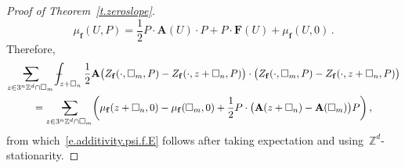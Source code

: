 \documentclass[11pt,twoside]{article} %
\makeatletter
\let\oldsquare\square %
\renewcommand{\square}{\oldsquare}
\numberwithin{equation}{section}
\theoremstyle{definition}
\newcommand*{\Zd}{\ensuremath{\mathbb{Z}^d}}
\newcommand{\f}{\mathbf{f}}
\newcommand{\cu}{\square}
\newcommand{\avsum}{\mathop{\mathpalette\avsuminner\relax}\displaylimits}
\newcommand\avsuminner[2]{%
  {\sbox0{$\m@th#1\sum$}%
   \vphantom{\usebox0}%
   \ooalign{%
     \hidewidth
     \smash{\,\rule[.23em]{8.8pt}{1.1pt} \relax}%
     \hidewidth\cr
   ~$\m@th#1\sum$\cr
   }%
  }%
}
\def\Xint#1{\mathchoice
{\XXint\displaystyle\textstyle{#1}}%
{\XXint\textstyle\scriptstyle{#1}}%
{\XXint\scriptstyle\scriptscriptstyle{#1}}%
{\XXint\scriptscriptstyle\scriptscriptstyle{#1}}%
\!\int}
\def\XXint#1#2#3{{\setbox0=\hbox{$#1{#2#3}{\int}$}
\vcenter{\hbox{$#2#3$}}\kern-.5\wd0}}
\def\fint{\Xint-}
\newcommand{\bfA}{\mathbf{A}}
\newcommand{\bfF}{\mathbf{F}}
\makeatother
\begin{document}
\begin{proof}[{Proof of Theorem~\ref{t.zeroslope}}]
\begin{equation*}
 \mu_{\f}(U,P) = 
\frac12 P \cdot \bfA(U) \cdot P
+ P \cdot   \bfF(U)  
 + \mu_{\f}(U,0)\,.
\end{equation*}
Therefore,
\begin{multline} 
\label{e.quadratic.response.Z.f}
\avsum_{z \in 3^n \Zd \cap \cu_m} \fint_{z+\cu_n} \frac12  \bfA \bigl(Z_{\f}(\cdot,\cu_m,P) - Z_{\f}(\cdot,z+\cu_n,P)\bigr) \cdot  \bigl(Z_{\f}(\cdot,\cu_m,P) - Z_{\f}(\cdot,z+\cu_n,P)\bigr)
\\
= 
\avsum_{z \in 3^n \Zd \cap \cu_m}  \biggl( \mu_{\f}(z+\cu_n,0) - \mu_{\f}(\cu_m,0) +  \frac12 P\cdot\bigl(\bfA(z+\cu_n) - \bfA(\cu_m)\bigr) P \biggr)
\,,
\end{multline}
from which~\eqref{e.additivity.psi.f.E} follows after taking expectation and using~$\Zd$-stationarity. 

\smallskip


\end{proof}
\end{document}
